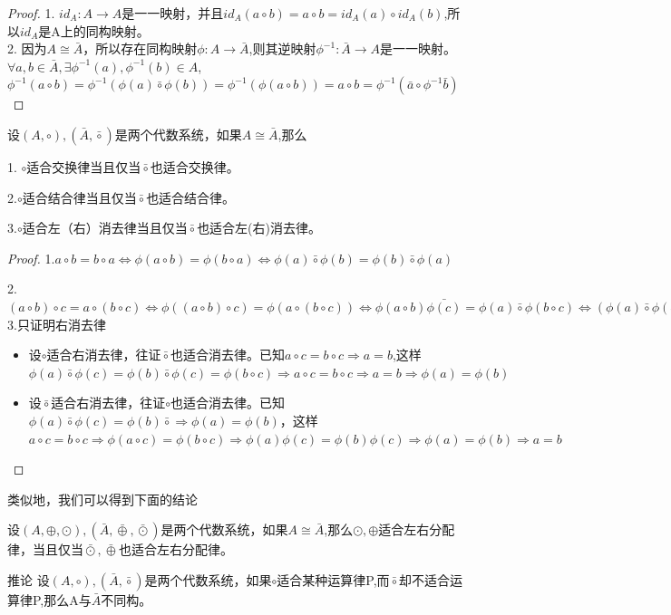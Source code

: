 \documentclass[
	11pt, %
	fleqn, %
	a4paper, %
]{LegrandOrangeBook}
\begin{document}
\begin{proof}
	1. $id_A:A\rightarrow A$是一一映射，并且$id_A(a\circ b)=a\circ b=id_A(a)\circ id_A(b)$,所以$id_A$是A上的同构映射。\\

	2. 因为$A\cong\bar{A}$，所以存在同构映射$\phi:A\rightarrow \bar{A}$,则其逆映射$\phi^{-1}:\bar{A}\rightarrow A$是一一映射。$\forall a,b\in \bar{A},\exists\phi^{-1}(a),\phi^{-1}(b)\in A $,$\phi^{-1}(a\circ b)=\phi^{-1}(\phi(a)\bar{\circ
		}\phi(b))=\phi^{-1}(\phi(a\circ b))=a\circ b=\phi^{-1}(\bar{a}\circ\phi^{-1}\bar{b})$
\end{proof}

\begin{theorem}
	设$(A,\circ),(\bar{A},\bar{\circ})$是两个代数系统，如果$A\cong\bar{A}$,那么

	1. $\circ$适合交换律当且仅当$\bar{\circ}$也适合交换律。

	2.$\circ$适合结合律当且仅当$\bar{\circ}$也适合结合律。

	3.$\circ$适合左（右）消去律当且仅当$\bar{\circ}$也适合左(右)消去律。
\end{theorem}

\begin{proof}
	1.$a\circ b=b\circ a\Longleftrightarrow\phi(a\circ b)=\phi(b\circ a)\Longleftrightarrow\phi(a)\bar{\circ}\phi(b)=\phi(b)\bar{\circ}\phi(a)$

	2.$(a\circ b)\circ c=a\circ(b\circ c)\Longleftrightarrow \phi((a\circ b)\circ c)=\phi(a\circ(b\circ c))\Longleftrightarrow\phi(a\circ b)\bar{\phi(c)}=\phi(a)\bar{\circ}\phi(b\circ c)\Longleftrightarrow(\phi(a)\bar{\circ}\phi(b))\bar{\circ}\phi(c)=\phi(a)\bar{\circ}(\phi(b)\bar{\circ}\phi(c))$
	3.只证明右消去律
	\begin{itemize}
		\item 设$\circ$适合右消去律，往证$\bar{\circ}$也适合消去律。已知$a\circ c=b\circ c\Rightarrow a=b$,这样$\phi(a)\bar{\circ}\phi(c)=\phi(b)\bar{\circ}\phi(c)=\phi(b\circ c)\Rightarrow a\circ c=b\circ c\Rightarrow a=b\Rightarrow\phi(a)=\phi(b)$
		\item 设$\bar{\circ}$适合右消去律，往证$\circ$也适合消去律。已知$\phi(a)\bar{\circ}\phi(c)=\phi(b)\bar{\circ}\Rightarrow\phi(a)=\phi(b)$，这样$a\circ c=b\circ c\Rightarrow \phi(a\circ c)=\phi(b\circ c)\Rightarrow \phi(a)\phi(c)=\phi(b)\phi(c)\Rightarrow \phi(a)=\phi(b)\Rightarrow a=b$
	\end{itemize}
\end{proof}

类似地，我们可以得到下面的结论
\begin{theorem}
	设$(A,\oplus,\odot),(\bar{A},\bar{\oplus},\bar{\odot})$是两个代数系统，如果$A\cong \bar{A}$,那么$\odot,\oplus$适合左右分配律，当且仅当$\bar{\odot},\bar{\oplus}$也适合左右分配律。
\end{theorem}
\begin{theorem}{推论}
	设$(A,\circ),(\bar{A},\bar{\circ})$是两个代数系统，如果$\circ$适合某种运算律P,而$\bar{\circ}$却不适合运算律P,那么A与$\bar{A}$不同构。
\end{theorem}
\end{document}
